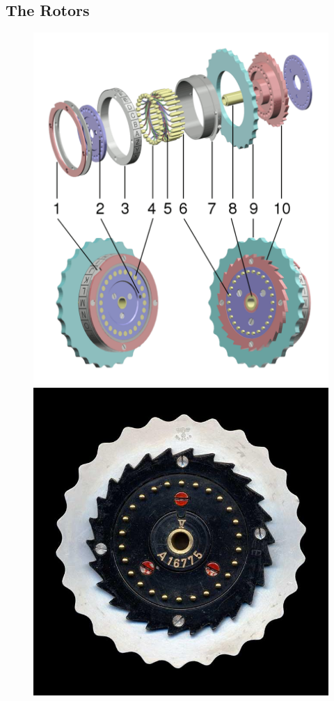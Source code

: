 \subsection{The Rotors}

\begin{figure}[H]
    \centering
    \begin{minipage}{0.48\textwidth}
        \centering
        \includegraphics[width=\linewidth]{paper/images/disassembled.png}
    \end{minipage}%
    \hfill
    \begin{minipage}{0.48\textwidth}
        \centering
        \includegraphics[width=0.8\linewidth]{paper/images/entry.jpg}

\end{minipage}
\end{figure}
